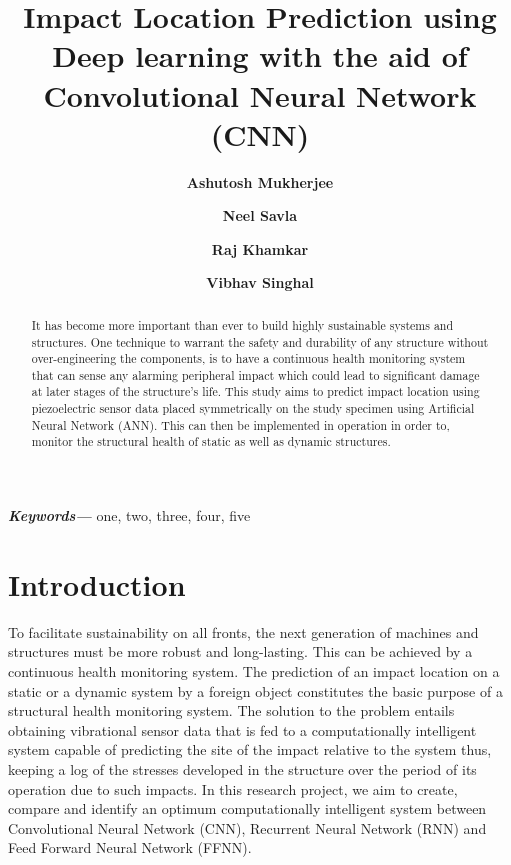 \documentclass[12pt]{article}
\def\reporttitle{\textbf{Impact Location Prediction using Deep learning with the aid of Convolutional Neural Network (CNN)}}
\providecommand{\keywords}[1]
{
  \small	
  \textbf{\textit{Keywords---}} #1
}
\begin{document}
\title{\reporttitle}
\author[1]{\textbf{Ashutosh Mukherjee}}
\author[2]{\textbf{Neel Savla}}
\author[2]{\textbf{Raj Khamkar}}
\author[2]{\textbf{Vibhav Singhal}}
\date{\vspace{-5ex}} %
\maketitle

\begin{abstract}
It has become more important than ever to build highly sustainable systems and structures. One technique to warrant the safety and durability of any structure without over-engineering the components, is to have a continuous health monitoring system that can sense any alarming peripheral impact which could lead to significant damage at later stages of the structure's life. This study aims to predict impact location using piezoelectric sensor data placed symmetrically on the study specimen using Artificial Neural Network (ANN). This can then be implemented in operation in order to, monitor the structural health of static as well as dynamic structures. 
\end{abstract} \hspace{10 pt}

\keywords{one, two, three, four, five}

\section{Introduction}

\setlength{\parindent}{20pt}
To facilitate sustainability on all fronts, the next generation of machines and structures must be more robust and long-lasting. This can be achieved by a continuous health monitoring system. The prediction of an impact location on a static or a dynamic system by a foreign object constitutes the basic purpose of a structural health monitoring system. The solution to the problem entails obtaining vibrational sensor data that is fed to a computationally intelligent system capable of predicting the site of the impact relative to the system thus, keeping a log of the stresses developed in the structure over the period of its operation due to such impacts. In this research project, we aim to create, compare and identify an optimum computationally intelligent system between Convolutional Neural Network (CNN), Recurrent Neural Network (RNN) and Feed Forward Neural Network (FFNN).
\end{document}

